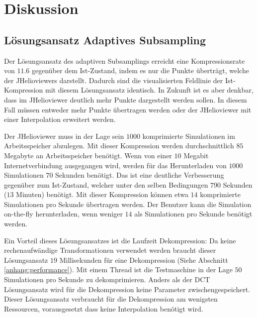 \section{Diskussion}

\subsection{Lösungsansatz Adaptives Subsampling}
Der Lösungsansatz des adaptiven Subsamplings erreicht eine Kompressionsrate von $11.6$ gegenüber dem Ist-Zustand, indem es nur die Punkte überträgt, welche der JHelioviewers darstellt. Dadurch sind die visualisierten Feldlinie der Ist-Kompression mit diesem Lösungsansatz identisch. In Zukunft ist es aber denkbar, dass im JHelioviewer deutlich mehr Punkte dargestellt werden sollen. In diesem Fall müssen entweder mehr Punkte übertragen werden oder der JHelioviewer mit einer Interpolation erweitert werden.

Der JHelioviewer muss in der Lage sein $1000$ komprimierte Simulationen im Arbeitsspeicher abzulegen. Mit dieser Kompression werden durchschnittlich $85$ Megabyte an Arbeitsspeicher benötigt. Wenn von einer $10$ Megabit Internetverbindung ausgegangen wird, werden für das Herunterladen von $1000$ Simulationen $70$ Sekunden benötigt. Das ist eine deutliche Verbesserung gegenüber zum Ist-Zustand, welcher unter den selben Bedingungen $790$ Sekunden ($13$ Minuten) benötigt. Mit dieser Kompression können etwa $14$ komprimierte Simulationen pro Sekunde übertragen werden. Der Benutzer kann die Simulation on-the-fly herunterladen, wenn weniger $14$ als Simulationen pro Sekunde benötigt werden.

Ein Vorteil dieses Lösungsansatzes ist die Laufzeit Dekompression: Da keine rechenaufwändige Transformationen verwendet werden braucht dieser Lösungsansatz $19$ Millisekunden für eine Dekompression (Siehe Abschnitt \ref{anhang:performance}). Mit einem Thread ist die Testmaschine in der Lage $50$ Simulationen pro Sekunde zu dekomprimieren. Anders als der DCT Lösungsansatz wird für die Dekompression keine Parameter zwischengespeichert. Dieser Lösungsansatz verbraucht für die Dekompression am wenigsten Ressourcen, vorausgesetzt dass keine Interpolation benötigt wird.

